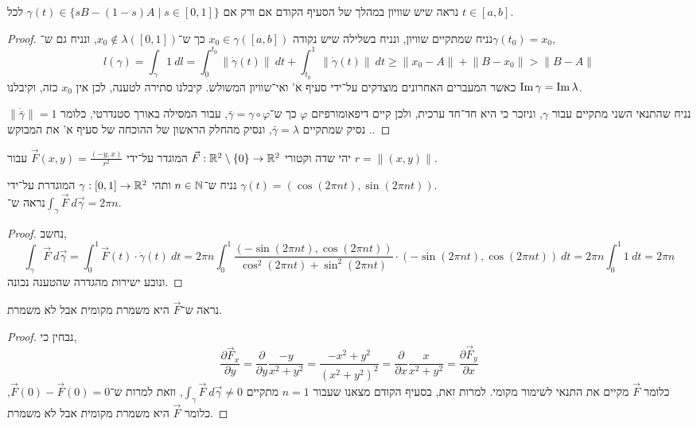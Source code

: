 \subquestion{}
נראה שיש שוויון במהלך של הסעיף הקודם אם ורק אם $\gamma(t) \in \{ s B - (1 - s) A \mid s \in [0, 1] \}$ לכל $t \in [a, b]$.
\begin{proof}
	נניח שמתקיים שוויון, ונניח בשלילה שיש נקודה $x_0 \in \gamma([a, b])$ כך ש־$x_0 \notin \lambda([0, 1])$, ונניח גם ש־$\gamma(t_0) = x_0$,
	\[
		l(\gamma)
		= \int_\gamma 1\ dl
		= \int_0^{t_0} \lVert \dot{\gamma}(t) \rVert\ dt
		+ \int_{t_0}^1 \lVert \dot{\gamma}(t) \rVert\ dt
		\ge \lVert x_0 - A \rVert + \lVert B - x_0 \rVert
		> \lVert B - A \rVert
	\]
	כאשר המעברים האחרונים מוצדקים על־ידי סעיף א' ואי־שוויון המשולש.
	קיבלנו סתירה לטענה, לכן אין $x_0$ כזה, וקיבלנו $\operatorname{Im} \gamma = \operatorname{Im} \lambda$.

	נניח שהתנאי השני מתקיים עבור $\gamma$, וניזכר כי היא חד־חד ערכית, ולכן קיים דיפאומורפיזם $\varphi$ כך ש־$\bar{\gamma} = \gamma \circ \varphi$, עבור המסילה באורך סטנדרטי, כלומר $\lVert \dot{\bar{\gamma}} \rVert = 1$.
	נסיק שמתקיים $\bar{\gamma} = \lambda$, ונסיק מהחלק הראשון של ההוכחה של סעיף א' את המבוקש.
\end{proof}

\question{}
יהי שדה וקטורי $\vec{F} : \mathbb{R}^2 \setminus \{0\} \to \mathbb{R}^2$ המוגדר על־ידי $\vec{F}(x, y) = \frac{(-y, x)}{r^2}$ עבור $r = \lVert (x, y) \rVert$.

\subquestion{}
נניח ש־$n \in \mathbb{N}$ ותהי $\gamma : [0, 1] \to \mathbb{R}^2$ המוגדרת על־ידי $\gamma(t) = (\cos(2\pi n t), \sin(2\pi n t))$. \\
נראה ש־$\int_\gamma \vec{F}\ d\vec{\gamma} = 2\pi n$.
\begin{proof}
	נחשב,
	\[
		\int_\gamma \vec{F}\ d\vec{\gamma}
		= \int_0^1 \vec{F}(t) \cdot \dot{\gamma}(t)\ dt
		= 2\pi n \int_0^1 \frac{(-\sin(2\pi n t), \cos(2\pi n t))}{\cos^2(2\pi n t) + \sin^2(2\pi n t)} \cdot (-\sin(2\pi n t), \cos(2\pi n t))\ dt
		= 2\pi n \int_0^1 1\ dt
		= 2\pi n
	\]
	ונובע ישירות מהגדרה שהטענה נכונה.
\end{proof}

\subquestion{}
נראה ש־$\vec{F}$ היא משמרת מקומית אבל לא משמרת.
\begin{proof}
	נבחין כי,
	\[
		\frac{\partial \vec{F}_x}{\partial y}
		= \frac{\partial}{\partial y}\frac{-y}{x^2 + y^2}
		= \frac{-x^2 + y^2}{{(x^2 + y^2)}^2}
		= \frac{\partial}{\partial x}\frac{x}{x^2 + y^2}
		= \frac{\partial \vec{F}_y}{\partial x}
	\]
	כלומר $\vec{F}$ מקיים את התנאי לשימור מקומי.
	למרות זאת, בסעיף הקודם מצאנו שעבור $n = 1$ מתקיים $\int_\gamma \vec{F}\ d\vec{\gamma} \ne 0$, וזאת למרות ש־$\vec{F}(0) - \vec{F}(0) = 0$, כלומר $\vec{F}$ היא משמרת מקומית אבל לא משמרת.
\end{proof}

